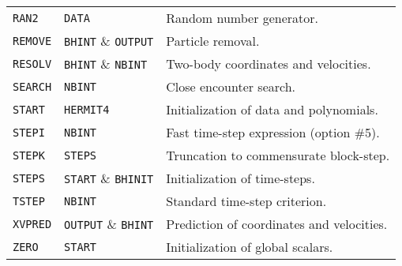 \documentclass[12pt]{article}
\begin{document}
\begin{table}[h]
\begin{tabular}{lll}
{\tt RAN2}   & {\tt DATA}   &Random number generator. \\
{\tt REMOVE} & {\tt BHINT} \& {\tt OUTPUT} &Particle removal. \\
{\tt RESOLV} & {\tt BHINT} \& {\tt NBINT}  &Two-body coordinates and velocities. \\
{\tt SEARCH} & {\tt NBINT}  &Close encounter search. \\
{\tt START}  & {\tt HERMIT4} &Initialization of data and polynomials. \\
{\tt STEPI}  & {\tt NBINT}  &Fast time-step expression (option \#5). \\
{\tt STEPK}  & {\tt STEPS}  &Truncation to commensurate block-step. \\
{\tt STEPS}  & {\tt START} \& {\tt BHINIT} &Initialization of time-steps. \\
{\tt TSTEP}  & {\tt NBINT}  &Standard time-step criterion. \\
{\tt XVPRED} & {\tt OUTPUT} \& {\tt BHINT} &Prediction of coordinates and velocities. \\
{\tt ZERO}   & {\tt START}  &Initialization of global scalars. \\
\hline\hline
\end{tabular}
\end{table}
\end{document}
